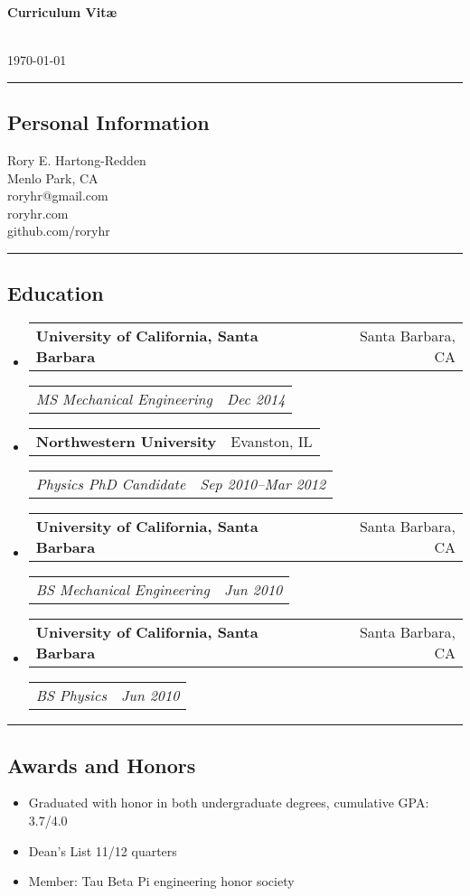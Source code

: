 \documentclass[10pt,letterpaper]{article}
\makeatletter
\newenvironment{indentsection}[1]%
{\begin{list}{}%
	{\setlength{\leftmargin}{#1}}%
	\item[]%
}
{\end{list}}
\newcommand{\headerrow}[2]
{\begin{tabular*}{\linewidth}{l@{\extracolsep{\fill}}r}
	#1 &
	#2 \\
\end{tabular*}}
\newcommand{\jobitem}[4]{\item \headerrow{\textbf{#1}}{#2}
\headerrow{\emph{#3}}{\emph{#4}}}
\makeatother
\begin{document}
{\raggedright \LARGE \bf Curriculum Vit\ae}\\
\today
\newline
\hrule
\subsection*{Personal Information}
\begin{indentsection}{\parindent}
Rory E. Hartong-Redden \\
Menlo Park, CA   \\
roryhr@gmail.com \\
roryhr.com \\
github.com/roryhr
\end{indentsection}

\hrule
\subsection*{Education}
\begin{itemize}
	\jobitem{University of California, Santa Barbara}	{Santa Barbara, CA}
			{MS  Mechanical Engineering}				{Dec 2014}
	\jobitem{Northwestern University}					{Evanston, IL}
			{Physics PhD Candidate}						{Sep 2010--Mar 2012}
	\jobitem{University of California, Santa Barbara}	{Santa Barbara, CA}	
			{BS Mechanical Engineering} 				{Jun 2010}
	\jobitem{University of California, Santa Barbara}	{Santa Barbara, CA}	
			{BS Physics} 								{Jun 2010}
\end{itemize}

\hrule
\subsection*{Awards and Honors}
\begin{indentsection}{\parindent}
	\begin{itemize}
		\parskip=-0.1em
		\item Graduated with honor in both undergraduate degrees, cumulative GPA: 3.7/4.0
		\item Dean's List 11/12 quarters
		\item Member: Tau Beta Pi engineering honor society
	\end{itemize}
\end{indentsection}
\end{document}
